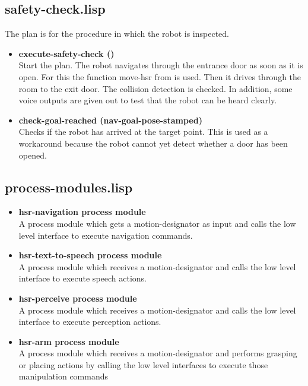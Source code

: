 \documentclass[main.tex]{subfiles}
\begin{document}
	    \subsection{safety-check.lisp}
	    The plan is for the procedure in which the robot is inspected. 
	    \begin{itemize}
	    	\item \textbf{execute-safety-check ()} \\
	    	Start the plan. The robot navigates through the entrance door as soon as it is open. For this the function move-hsr from  is used. Then it drives through the room to the exit door. The collision detection is checked. In addition, some voice outputs are given out to test that the robot can be heard clearly.
	    	\item \textbf{check-goal-reached (nav-goal-pose-stamped)}\\
	    	Checks if the robot has arrived at the target point. This is used as a workaround because the robot cannot yet detect whether a door has been opened.
	    \end{itemize}
	    \subsection{process-modules.lisp}
	     \begin{itemize}
		\label{pcm}
	    	\item \textbf{hsr-navigation process module} \\
		A process module which gets a motion-designator as input and calls the low level interface to execute navigation commands.
		\item \textbf{hsr-text-to-speech process module} \\
		A process module which receives a motion-designator and calls the low level interface to execute speech actions.
		\item \textbf{hsr-perceive process module} \\
		A process module which receives a motion-designator and calls the low level interface to execute perception actions.
		\item\textbf{hsr-arm process module} \\
		A process module which receives a motion-designator and performs grasping or placing actions by calling the low level interfaces to execute those manipulation commands 
	    \end{itemize}
\end{document}
